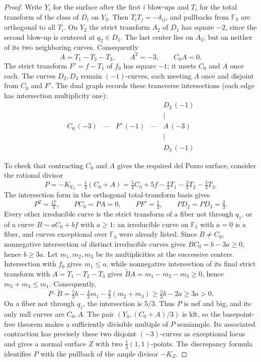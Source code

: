\documentclass[11pt]{article}
\theoremstyle{plain}
\theoremstyle{definition}
\theoremstyle{remark}
\newcommand{\F}{\mathbb F}
\begin{document}
\begin{proof}
Write \(Y_i\) for the surface after the first \(i\) blow-ups and
\(T_i\) for the total transform of the class of \(D_i\) on \(Y_3\).
Then \(T_iT_j=-\delta_{ij}\), and pullbacks from \(\F_3\) are
orthogonal to all \(T_i\). On \(Y_2\) the strict transform
\(A_2\) of \(D_1\) has square \(-2\), since the second blow-up is centered
at \(q_2\in D_1\). The last center lies on
\(A_2\), but on neither of its two neighboring curves. Consequently
\[
A=T_1-T_2-T_3,\qquad A^2=-3,\qquad C_0A=0.
\]
The strict transform \(F'=f-T_1\) of \(f_0\) has square \(-1\);
it meets \(C_0\) and \(A\) once each. The curves \(D_2,D_3\)
remain \((-1)\)-curves, each meeting \(A\) once and disjoint from
\(C_0\) and \(F'\). The dual graph records these transverse
intersections (each edge has intersection multiplicity one):
\[
\begin{array}{ccccc}
&&&&D_2\,(-1)\\[-2pt]
&&&&|\\[-2pt]
C_0\,(-3)&\text{---}&F'\,(-1)&\text{---}&A\,(-3)\\[-2pt]
&&&&|\\[-2pt]
&&&&D_3\,(-1)
\end{array}
\]

To check that contracting \(C_0\) and \(A\) gives the required del
Pezzo surface, consider the rational divisor
\[
P=-K_{Y_3}-\tfrac13(C_0+A)
 =\tfrac53 C_0+5f-\tfrac43T_1-\tfrac23T_2-\tfrac23T_3.
\]
The intersection form in the orthogonal total-transform basis gives
\[
P^2=\tfrac{17}{3},\qquad
PC_0=PA=0,\qquad PF'=\tfrac13,\qquad PD_2=PD_3=\tfrac23.
\]
Every other irreducible curve is the strict transform of a fiber not
through \(q_1\), or of a curve \(B\sim aC_0+bf\) with
\(a\geq1\): an irreducible curve on \(\F_3\) with \(a=0\) is a
fiber, and curves exceptional over \(\F_3\) were already listed.
Since \(B\ne C_0\), nonnegative intersection of
distinct irreducible curves gives \(BC_0=b-3a\geq0\), hence
\(b\geq3a\). Let \(m_1,m_2,m_3\) be its multiplicities at the
successive centers.
Intersection with \(f_0\) gives \(m_1\leq a\), while nonnegative
intersection of its final strict transform with
\(A=T_1-T_2-T_3\) gives
\(\widetilde B A=m_1-m_2-m_3\geq0\), hence
\(m_2+m_3\leq m_1\). Consequently,
\[
P\cdot\widetilde B
 =\tfrac53b-\tfrac43m_1-\tfrac23(m_2+m_3)
 \geq\tfrac53b-2a\geq3a>0.
\]
On a fiber not through \(q_1\), the intersection is \(5/3\).
Thus \(P\) is nef and big, and its only null curves are \(C_0,A\).
The pair \((Y_3,(C_0+A)/3)\) is klt, so the basepoint-free theorem
\cite[Section~3.2]{Kollar1998} makes a sufficiently divisible multiple
of \(P\) semiample. Its associated contraction has precisely these
two disjoint \((-3)\)-curves as exceptional locus and gives a normal
surface \(Z\) with two \(\frac13(1,1)\)-points. The discrepancy
formula identifies \(P\) with the pullback of the ample divisor
\(-K_Z\).


\end{proof}
\end{document}
